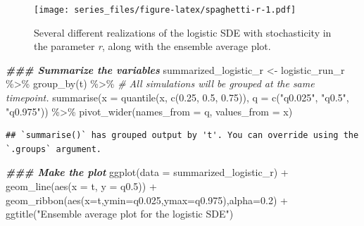 \documentclass[
]{book}
\newenvironment{Shaded}{\begin{snugshade}}{\end{snugshade}}
\newcommand{\AttributeTok}[1]{\textcolor[rgb]{0.77,0.63,0.00}{#1}}
\newcommand{\CommentTok}[1]{\textcolor[rgb]{0.56,0.35,0.01}{\textit{#1}}}
\newcommand{\DocumentationTok}[1]{\textcolor[rgb]{0.56,0.35,0.01}{\textbf{\textit{#1}}}}
\newcommand{\FloatTok}[1]{\textcolor[rgb]{0.00,0.00,0.81}{#1}}
\newcommand{\FunctionTok}[1]{\textcolor[rgb]{0.00,0.00,0.00}{#1}}
\newcommand{\NormalTok}[1]{#1}
\newcommand{\OtherTok}[1]{\textcolor[rgb]{0.56,0.35,0.01}{#1}}
\newcommand{\SpecialCharTok}[1]{\textcolor[rgb]{0.00,0.00,0.00}{#1}}
\newcommand{\StringTok}[1]{\textcolor[rgb]{0.31,0.60,0.02}{#1}}
\theoremstyle{definition}
\theoremstyle{definition}
\theoremstyle{definition}
\theoremstyle{remark}
\begin{document}
\begin{figure}
\centering
\texttt{[image: series\_files/figure-latex/spaghetti-r-1.pdf]}
\caption{\label{fig:spaghetti-r-1}Several different realizations of the logistic SDE with stochasticity in the parameter \emph{r}, along with the ensemble average plot.}
\end{figure}

\begin{Shaded}
\begin{Highlighting}[]
  \DocumentationTok{\#\#\# Summarize the variables}
\NormalTok{summarized\_logistic\_r }\OtherTok{\textless{}{-}}\NormalTok{ logistic\_run\_r }\SpecialCharTok{\%\textgreater{}\%}
  \FunctionTok{group\_by}\NormalTok{(t) }\SpecialCharTok{\%\textgreater{}\%}  \CommentTok{\# All simulations will be grouped at the same timepoint.}
  \FunctionTok{summarise}\NormalTok{(}\AttributeTok{x =} \FunctionTok{quantile}\NormalTok{(x, }\FunctionTok{c}\NormalTok{(}\FloatTok{0.25}\NormalTok{, }\FloatTok{0.5}\NormalTok{, }\FloatTok{0.75}\NormalTok{)), }\AttributeTok{q =} \FunctionTok{c}\NormalTok{(}\StringTok{"q0.025"}\NormalTok{, }\StringTok{"q0.5"}\NormalTok{, }\StringTok{"q0.975"}\NormalTok{)) }\SpecialCharTok{\%\textgreater{}\%}
  \FunctionTok{pivot\_wider}\NormalTok{(}\AttributeTok{names\_from =}\NormalTok{ q, }\AttributeTok{values\_from =}\NormalTok{ x)}
\end{Highlighting}
\end{Shaded}

\begin{verbatim}
## `summarise()` has grouped output by 't'. You can override using the `.groups` argument.
\end{verbatim}

\begin{Shaded}
\begin{Highlighting}[]
\DocumentationTok{\#\#\# Make the plot}
\FunctionTok{ggplot}\NormalTok{(}\AttributeTok{data =}\NormalTok{ summarized\_logistic\_r) }\SpecialCharTok{+}
  \FunctionTok{geom\_line}\NormalTok{(}\FunctionTok{aes}\NormalTok{(}\AttributeTok{x =}\NormalTok{ t, }\AttributeTok{y =}\NormalTok{ q0}\FloatTok{.5}\NormalTok{)) }\SpecialCharTok{+}
  \FunctionTok{geom\_ribbon}\NormalTok{(}\FunctionTok{aes}\NormalTok{(}\AttributeTok{x=}\NormalTok{t,}\AttributeTok{ymin=}\NormalTok{q0}\FloatTok{.025}\NormalTok{,}\AttributeTok{ymax=}\NormalTok{q0}\FloatTok{.975}\NormalTok{),}\AttributeTok{alpha=}\FloatTok{0.2}\NormalTok{) }\SpecialCharTok{+}
  \FunctionTok{ggtitle}\NormalTok{(}\StringTok{"Ensemble average plot for the logistic SDE"}\NormalTok{)}
\end{Highlighting}
\end{Shaded}
\end{document}
